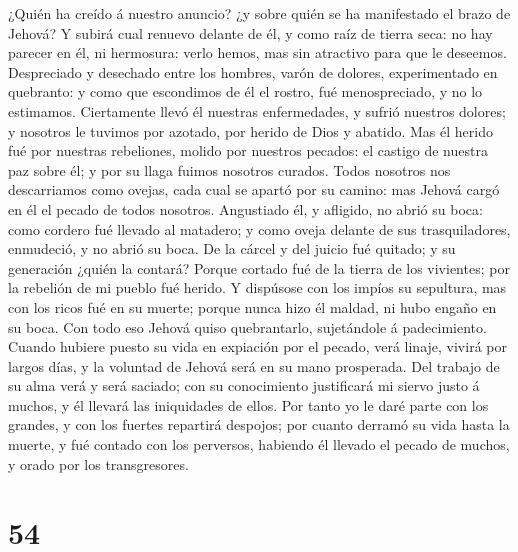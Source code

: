  ¿Quién ha creído á nuestro anuncio? ¿y sobre quién se ha
manifestado el brazo de Jehová?  Y subirá cual renuevo
delante de él, y como raíz de tierra seca: no hay parecer en él, ni
hermosura: verlo hemos, mas sin atractivo para que le deseemos.
 Despreciado y desechado entre los hombres, varón de
dolores, experimentado en quebranto: y como que escondimos de él el
rostro, fué menospreciado, y no lo estimamos.  Ciertamente
llevó él nuestras enfermedades, y sufrió nuestros dolores; y nosotros le
tuvimos por azotado, por herido de Dios y abatido.  Mas él
herido fué por nuestras rebeliones, molido por nuestros pecados: el
castigo de nuestra paz sobre él; y por su llaga fuimos nosotros curados.
 Todos nosotros nos descarriamos como ovejas, cada cual se
apartó por su camino: mas Jehová cargó en él el pecado de todos
nosotros.  Angustiado él, y afligido, no abrió su boca:
como cordero fué llevado al matadero; y como oveja delante de sus
trasquiladores, enmudeció, y no abrió su boca.  De la
cárcel y del juicio fué quitado; y su generación ¿quién la contará?
Porque cortado fué de la tierra de los vivientes; por la rebelión de mi
pueblo fué herido.  Y dispúsose con los impíos su
sepultura, mas con los ricos fué en su muerte; porque nunca hizo él
maldad, ni hubo engaño en su boca.  Con todo eso Jehová
quiso quebrantarlo, sujetándole á padecimiento. Cuando hubiere puesto su
vida en expiación por el pecado, verá linaje, vivirá por largos días, y
la voluntad de Jehová será en su mano prosperada.  Del
trabajo de su alma verá y será saciado; con su conocimiento justificará
mi siervo justo á muchos, y él llevará las iniquidades de ellos.
 Por tanto yo le daré parte con los grandes, y con los
fuertes repartirá despojos; por cuanto derramó su vida hasta la muerte,
y fué contado con los perversos, habiendo él llevado el pecado de
muchos, y orado por los transgresores.

\hypertarget{section-53}{%
\section{54}\label{section-53}}

